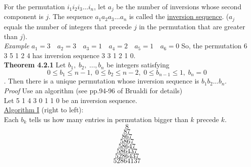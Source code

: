 \documentclass[12pt]{article}
\begin{document}
For the permutation $i_1i_2i_3\ldots i_n$, let $a_j$ be the number of inversions whose second component is $j$. The sequence $a_1a_2a_3\ldots a_n$ is called the \underline{inversion sequence}. ($a_j$ equals the number of integers that precede $j$ in the permutation that are greater than $j$).\\

{\sl Example} $a_1=3\quad a_2=3\quad a_3=1\quad a_4=2\quad a_5=1\quad a_6=0$
So, the permutation 6 3 5 1 2 4 has inversion sequence 3 3 1 2 1 0.\\

{\bf Theorem 4.2.1} Let $b_1,\;b_2,\;...,b_n$ be integers satisfying $$0\le b_1\le n-1,\;0\le b_2\le n-2,\;0\le b_{n-1}\le 1,\; b_n=0$$. Then there is a unique permutation whose inversion sequence is $b_1b_2\ldots b_n$.\\

{\sl Proof} Use an algorithm (see pp.94-96 of Brualdi for details)\\
Let 5 1 4 3 0 1 1 0 be an inversion sequence.\\

\underline{Algorithm I} (right to left):\\ 
Each $b_k$ tells us how many entries in permutation bigger than $k$ precede $k$.
$$8$$
$$87$$
$$867$$
$$5867$$
$$58647$$
$$586437$$
$$5286437$$
$$52864137$$\\
\end{document}
